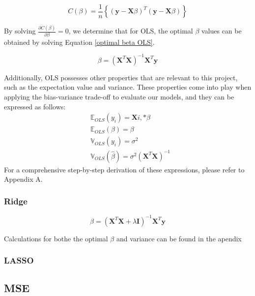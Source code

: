 \begin{equation}
C(\beta) = \frac{1}{n} \left\lbrace ( \textbf{y} - \textbf{X}\beta )^T (\textbf{y} - \textbf{X}\beta)\right\rbrace \label{cost_function}
\end{equation}

\noindent By solving $\frac{\partial C(\beta)}{\partial \beta} = 0$, we determine that 
for OLS, the optimal $\beta$ values can be obtained by solving Equation
\eqref{optimal beta OLS}.

\begin{equation}
\beta = (\textbf{X}^T \textbf{X})^{-1}\textbf{X}^T \textbf{y} \label{optimal beta OLS}
\end{equation}

\noindent Additionally, OLS possesses other properties that are relevant to this project,
such as the expectation value and variance. These properties come into play 
when applying the bias-variance trade-off to evaluate our models, and they can 
be expressed as follows:
\begin{align}
&\mathbb{E}_{OLS}(y_i) = \textbf{X}{i,*} \beta\\
&\mathbb{E}_{OLS}(\beta) = \beta\\
&\mathbb{V}_{OLS}(y_i) = \sigma^2\\
&\mathbb{V}_{OLS}(\hat{\beta}) = \sigma^2 (\textbf{X}^T \textbf{X})^{-1}
\end{align}
\noindent For a comprehensive step-by-step derivation of these expressions, please refer
to Appendix A.



\subsubsection{Ridge}
\begin{equation}
    \beta = (\textbf{X}^T \textbf{X} + \lambda \textbf{I})^{-1}\textbf{X}^T \textbf{y}
\end{equation}

Calculations for bothe the optimal $\beta$ and variance can be found in the apendix
\subsubsection{LASSO}

\subsection{MSE}



